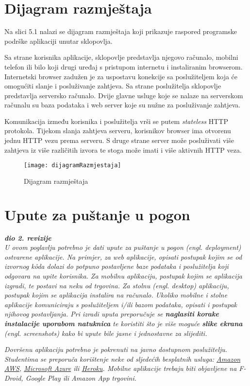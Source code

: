 			\eject 
		
		
		\section{Dijagram razmještaja}
			
			Na slici 5.1 nalazi se dijagram razmještaja koji prikazuje raspored programske podrške aplikaciji unutar sklopovlja.
			
			Sa strane korisnika aplikacije, sklopovlje predstavlja njegovo računalo, mobilni telefon ili bilo koji drugi uređaj s pristupom internetu i instaliranim browserom.
			Internetski browser zadužen je za uspostavu konekcije sa poslužiteljem koja će omogućiti slanje i posluživanje zahtjeva.
			Sa strane poslužitelja sklopovlje predstavlja serversko računalo.
			Dvije glavne usluge koje se nalaze na serverskom računalu su baza podataka i web server koje su nužne za posluživanje zahtjeva.
			
			Komunikacija između korisnika i poslužitelja vrši se putem \textit{stateless} HTTP protokola. 
			Tijekom slanja zahtjeva serveru, korisnikov browser ima otvorenu jednu HTTP vezu prema serveru.
			S druge strane server može posluživati više zahtjeva iz više različitih izvora te stoga može imati i više aktivnih HTTP veza.
			
			\begin{figure}[h]
				\texttt{[image: dijagramRazmjestaja]}
				\caption{Dijagram razmještaja}
			\end{figure} 
			
			\eject 
		
		\section{Upute za puštanje u pogon}
		
			\textbf{\textit{dio 2. revizije}}\\
		
			 \textit{U ovom poglavlju potrebno je dati upute za puštanje u pogon (engl. deployment) ostvarene aplikacije. Na primjer, za web aplikacije, opisati postupak kojim se od izvornog kôda dolazi do potpuno postavljene baze podataka i poslužitelja koji odgovara na upite korisnika. Za mobilnu aplikaciju, postupak kojim se aplikacija izgradi, te postavi na neku od trgovina. Za stolnu (engl. desktop) aplikaciju, postupak kojim se aplikacija instalira na računalo. Ukoliko mobilne i stolne aplikacije komuniciraju s poslužiteljem i/ili bazom podataka, opisati i postupak njihovog postavljanja. Pri izradi uputa preporučuje se \textbf{naglasiti korake instalacije uporabom natuknica} te koristiti što je više moguće \textbf{slike ekrana} (engl. screenshots) kako bi upute bile jasne i jednostavne za slijediti.}
			
			
			 \textit{Dovršenu aplikaciju potrebno je pokrenuti na javno dostupnom poslužitelju. Studentima se preporuča korištenje neke od sljedećih besplatnih usluga: \href{https://aws.amazon.com/}{Amazon AWS}, \href{https://azure.microsoft.com/en-us/}{Microsoft Azure} ili \href{https://www.heroku.com/}{Heroku}. Mobilne aplikacije trebaju biti objavljene na F-Droid, Google Play ili Amazon App trgovini.}
			
			
			\eject 